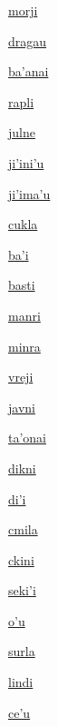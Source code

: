 {\hyperlink{val:morji}{morji}}{}{}{}

{\hyperlink{val:dragau}{dragau}}{}{}{}

{\hyperlink{val:bahanai}{ba'anai}}{}{}{}

{\hyperlink{val:rapli}{rapli}}{}{}{}

{\hyperlink{val:julne}{julne}}{}{}{}

{\hyperlink{val:jihinihu}{ji'ini'u}}{}{}{}

{\hyperlink{val:jihimahu}{ji'ima'u}}{}{}{}

{\hyperlink{val:cukla}{cukla}}{}{}{}

{\hyperlink{val:bahi}{ba'i}}{}{}{}

{\hyperlink{val:basti}{basti}}{}{}{}

{\hyperlink{val:manri}{manri}}{}{}{}

{\hyperlink{val:minra}{minra}}{}{}{}

{\hyperlink{val:vreji}{vreji}}{}{}{}

{\hyperlink{val:javni}{javni}}{}{}{}

{\hyperlink{val:tahonai}{ta'onai}}{}{}{}

{\hyperlink{val:dikni}{dikni}}{}{}{}

{\hyperlink{val:dihi}{di'i}}{}{}{}

{\hyperlink{val:cmila}{cmila}}{}{}{}

{\hyperlink{val:ckini}{ckini}}{}{}{}

{\hyperlink{val:sekihi}{seki'i}}{}{}{}

{\hyperlink{val:ohu}{o'u}}{}{}{}

{\hyperlink{val:surla}{surla}}{}{}{}

{\hyperlink{val:lindi}{lindi}}{}{}{}

{\hyperlink{val:cehu}{ce'u}}{}{}{}

